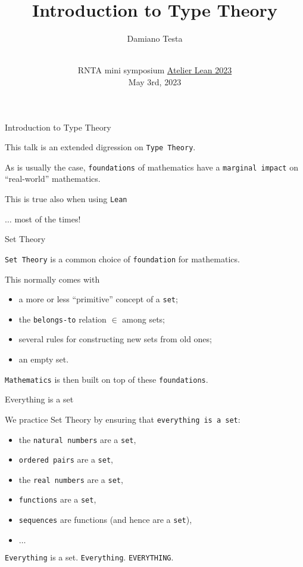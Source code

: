 \documentclass{beamer}
\title{Introduction to Type Theory}
\author{Damiano Testa}
\institute[]{University of Warwick}
\date[\href{http://www.rnta.eu/7MSRNTA/lean.html}{Atelier Lean 2023}]{\\
\vspace{50pt}
RNTA mini symposium
\href{http://www.rnta.eu/7MSRNTA/lean.html}{Atelier Lean 2023}\\
\vspace{20pt}
May 3rd, 2023
}
\begin{document}
\frame{\titlepage}

\begin{frame}[fragile]
{Introduction to Type Theory}

This talk is an extended digression on {\color{violet}\verb`Type Theory`}.

As is usually the case, {\color{violet}\verb`foundations`} of mathematics have a {\color{violet}\verb`marginal impact`} on ``real-world'' mathematics.

This is true also when using {\color{violet}\verb`Lean`}

$\ldots$ most of the times!
\end{frame}

\begin{frame}[fragile]{Set Theory}

{\color{violet}\verb`Set Theory`} is a common choice of {\color{violet}\verb`foundation`} for mathematics.

This normally comes with

\vspace{-13pt}
\begin{itemize}
\setlength\itemsep{-12pt}
\item
  a more or less ``primitive'' concept of a {\color{violet}\verb`set`};
\item
  the {\color{violet}\verb`belongs-to`} relation $\in$ among sets;
\item
  several rules for constructing new sets from old ones;
\item
  an empty set.
\end{itemize}

{\color{violet}\verb`Mathematics`} is then built on top of these {\color{violet}\verb`foundations`}.
\end{frame}

\begin{frame}[fragile]{Everything is a set}

We practice Set Theory by ensuring that {\color{violet}\verb`everything is a set`}:

\vspace{-13pt}
\begin{itemize}
\setlength\itemsep{-12pt}
\item
  the {\color{violet}\verb`natural numbers`} are a {\color{violet}\verb`set`},
\item
  {\color{violet}\verb`ordered pairs`} are a {\color{violet}\verb`set`},
\item
  the {\color{violet}\verb`real numbers`} are a {\color{violet}\verb`set`},
\item
  {\color{violet}\verb`functions`} are a {\color{violet}\verb`set`},
\item
  {\color{violet}\verb`sequences`} are functions (and hence are a {\color{violet}\verb`set`}),
\item
  $\ldots$
\end{itemize}

{\color{violet}\verb`Everything`} is a set. {\color{violet}\verb`Everything`}. {\color{violet}\verb`EVERYTHING`}.
\end{frame}
\end{document}
